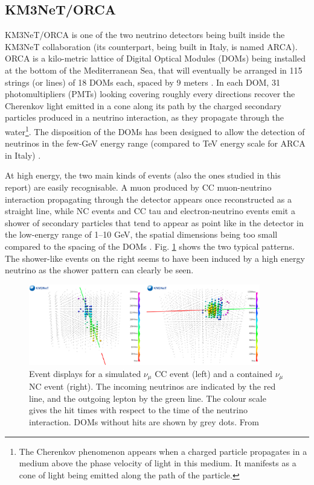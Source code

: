\subsection{KM3NeT/ORCA}

KM3NeT/ORCA is one of the two neutrino detectors being built inside the KM3NeT collaboration (its counterpart, being built in Italy, is named ARCA). ORCA is a kilo-metric lattice of Digital Optical Modules (DOMs) being installed at the bottom of the Mediterranean Sea, that will eventually be arranged in 115 strings (or lines) of 18 DOMs each, spaced by 9 meters \citep{Adrian-Martinez:2016fdl}. In each DOM, 31 photomultipliers (PMTs) looking covering roughly every directions recover the Cherenkov light emitted in a cone along its path by the charged secondary particles produced in a neutrino interaction, as they propagate through the water\footnote{The Cherenkov phenomenon appears when a charged particle propagates in a medium above the phase velocity of light in this medium. It manifests as a cone of light being emitted along the path of the particle.}. The disposition of the DOMs has been designed to allow the detection of neutrinos in the few-GeV energy range (compared to TeV energy scale for ARCA in Italy) \citep{Adrian-Martinez:2016fdl}.

At high energy, the two main kinds of events (also the ones studied in this report) are easily recognisable. A muon produced by CC muon-neutrino interaction propagating through the detector appears once reconstructed as a straight line, while NC events and CC tau and electron-neutrino events emit a shower of secondary particles that tend to appear as point like in the detector in the low-energy range of 1--10 GeV, the spatial dimensions being too small compared to the spacing of the DOMs \citep{Adrian-Martinez:2016fdl}. Fig. \ref{fig:POJRIDG} shows the two typical patterns. The shower-like events on the right seems to have been induced by a high energy neutrino as the shower pattern can clearly be seen.

\begin{figure}[h!]
    \centering
    \includegraphics[width=0.90\textwidth]{fig/Shower_vs_Track.jpg}
    \caption{Event displays for a simulated ${\nu }_{\mu }$ CC event (left) and a contained ${\nu }_{\mu }$ NC event (right). The incoming neutrinos are indicated by the red line, and the outgoing lepton by the green line. The colour scale gives the hit times with respect to the time of the neutrino interaction. DOMs without hits are shown by grey dots. From \citep{Adrian-Martinez:2016fdl}}
    \label{fig:POJRIDG}
\end{figure}

